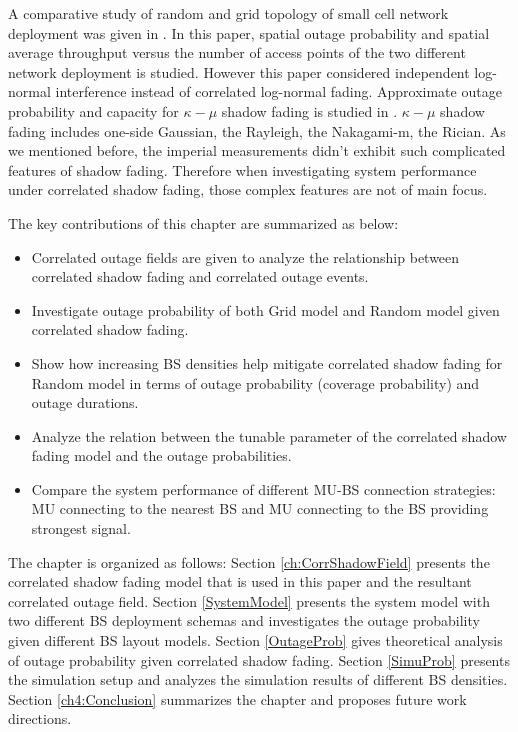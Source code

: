 \par A comparative study of random and grid topology of small cell network deployment was given in \cite{chen2012small}. In this paper, spatial outage probability and spatial average throughput versus the number of access points of the two different network deployment is studied. However this paper considered independent log-normal interference instead of correlated log-normal fading. Approximate outage probability and capacity for $\kappa-\mu$ shadow fading is studied in \cite{kumar2015approximate}. $\kappa-\mu$ shadow fading includes one-side Gaussian, the Rayleigh, the Nakagami-m, the Rician. As we mentioned before, the imperial measurements didn't exhibit such complicated features of shadow fading. Therefore when investigating system performance under correlated shadow fading, those complex features are not of main focus.
\par The key contributions of this chapter are summarized as below:
\begin{itemize}
\item Correlated outage fields are given to analyze the relationship between correlated shadow fading and correlated outage events. 
\item Investigate outage probability of both Grid model and Random model given correlated shadow fading.
\item Show how increasing BS densities help mitigate correlated shadow fading for Random model in terms of outage probability (coverage probability) and outage durations.
\item Analyze the relation between the tunable parameter of the correlated shadow fading model and the outage probabilities.
\item Compare the system performance of different MU-BS connection strategies: MU connecting to the nearest BS and MU connecting to the BS providing strongest signal.
\end{itemize}
The chapter is organized as follows: Section \ref{ch:CorrShadowField} presents the correlated shadow fading model that is used in this paper and the resultant correlated outage field. Section \ref{SystemModel} presents the system model with two different BS deployment schemas and investigates the outage probability given different BS layout models. Section \ref{OutageProb} gives theoretical analysis of outage probability given correlated shadow fading. Section \ref{SimuProb} presents the simulation setup and analyzes the simulation results of different BS densities. Section \ref{ch4:Conclusion} summarizes the chapter and proposes future work directions.
